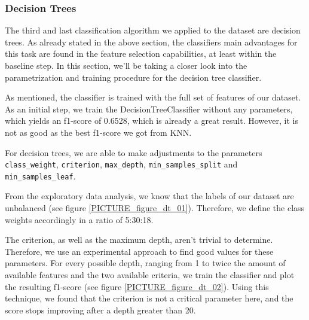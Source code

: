 \subsubsection{Decision Trees}

The third and last classification algorithm we applied to the dataset are decision trees. As already stated in the above section, the classifiers main advantages for this task are found in the feature selection capabilities, at least within the baseline step. In this section, we’ll be taking a closer look into the parametrization and training procedure for the decision tree classifier.

As mentioned, the classifier is trained with the full set of features of our dataset. As an initial step, we train the DecisionTreeClassifier without any parameters, which yields an f1-score of 0.6528, which is already a great result. However, it is not as good as the best f1-score we got from KNN.

For decision trees, we are able to make adjustments to the parameters \texttt{class\_weight}, \texttt{criterion}, \texttt{max\_depth}, \texttt{min\_samples\_split} and \texttt{min\_samples\_leaf}.
    
From the exploratory data analysis, we know that the labels of our dataset are unbalanced (see figure \ref{PICTURE_figure_dt_01}). Therefore, we define the class weights accordingly in a ratio of 5:30:18.

The criterion, as well as the maximum depth, aren’t trivial to determine. Therefore, we use an experimental approach to find good values for these parameters. For every possible depth, ranging from 1 to twice the amount of available features and the two available criteria, we train the classifier and plot the resulting f1-score (see figure \ref{PICTURE_figure_dt_02}). Using this technique, we found that the criterion is not a critical parameter here, and the score stops improving after a depth greater than 20.

